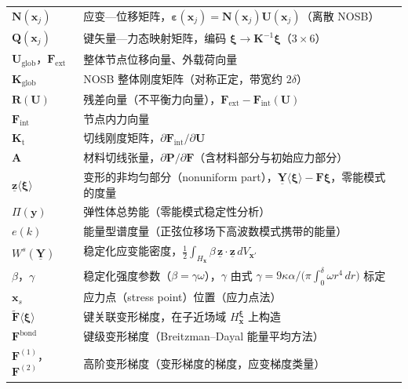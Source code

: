 \begin{longtable}{@{}p{4.8cm}>{\raggedright\arraybackslash}p{10.2cm}@{}}
  $\mathbf{N}(\mathbf{x}_j)$ & 应变—位移矩阵，$\boldsymbol{\varepsilon}(\mathbf{x}_j)=\mathbf{N}(\mathbf{x}_j)\mathbf{U}(\mathbf{x}_j)$（离散 NOSB） \\
  $\mathbf{Q}(\mathbf{x}_j)$ & 键矢量—力态映射矩阵，编码 $\boldsymbol{\xi}\to\mathbf{K}^{-1}\boldsymbol{\xi}$（$3\times 6$） \\
  $\mathbf{U}_{\mathrm{glob}}$，$\mathbf{F}_{\mathrm{ext}}$ & 整体节点位移向量、外载荷向量 \\
  $\mathbf{K}_{\mathrm{glob}}$ & NOSB 整体刚度矩阵（对称正定，带宽约 $2\delta$） \\
  $\mathbf{R}(\mathbf{U})$ & 残差向量（不平衡力向量），$\mathbf{F}_{\mathrm{ext}}-\mathbf{F}_{\mathrm{int}}(\mathbf{U})$ \\
  $\mathbf{F}_{\mathrm{int}}$ & 节点内力向量 \\
  $\mathbf{K}_{\mathrm{t}}$ & 切线刚度矩阵，$\partial\mathbf{F}_{\mathrm{int}}/\partial\mathbf{U}$ \\
  $\mathbf{A}$ & 材料切线张量，$\partial\mathbf{P}/\partial\mathbf{F}$（含材料部分与初始应力部分） \\
  $\underline{\mathbf{z}}\langle\boldsymbol{\xi}\rangle$ & 变形的非均匀部分（nonuniform part），$\underline{\mathbf{Y}}\langle\boldsymbol{\xi}\rangle-\mathbf{F}\boldsymbol{\xi}$，零能模式的度量 \\
  $\Pi(\mathbf{y})$ & 弹性体总势能（零能模式稳定性分析） \\
  $e(k)$ & 能量型谱度量（正弦位移场下高波数模式携带的能量） \\
  $W^{s}(\underline{\mathbf{Y}})$ & 稳定化应变能密度，$\frac{1}{2}\int_{H_{\mathbf{x}}}\beta\,\underline{\mathbf{z}}\cdot\underline{\mathbf{z}}\,dV_{\mathbf{x}'}$ \\
  $\beta$，$\gamma$ & 稳定化强度参数（$\beta=\gamma\omega$），$\gamma$ 由式 $\gamma=9\kappa\alpha/\bigl(\pi\int_0^\delta\omega r^4\,dr\bigr)$ 标定 \\
  $\mathbf{x}_{s}$ & 应力点（stress point）位置（应力点法） \\
  $\tilde{\mathbf{F}}\langle\boldsymbol{\xi}\rangle$ & 键关联变形梯度，在子近场域 $H_{\mathbf{x}}^{\boldsymbol{\xi}}$ 上构造 \\
  $\mathbf{F}^{\mathrm{bond}}$ & 键级变形梯度（Breitzman–Dayal 能量平均方法） \\
  $\mathbf{F}^{(1)}$，$\mathbf{F}^{(2)}$ & 高阶变形梯度（变形梯度的梯度，应变梯度类量） \\

\end{longtable}
